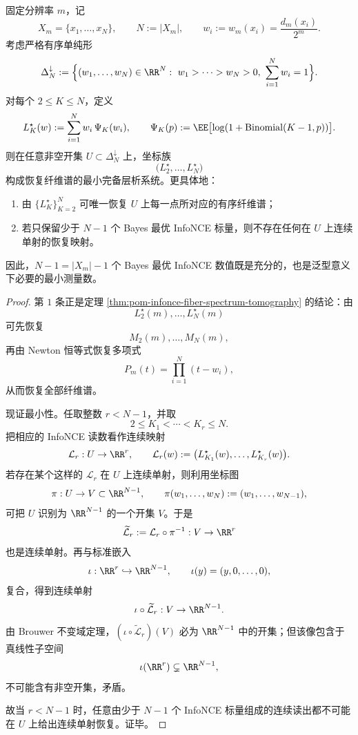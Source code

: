 \begin{theorem}\label{thm:pom-infonce-fiber-spectrum-tomography-minimality}
固定分辨率 \(m\)，记
\[
X_m=\{x_1,\dots,x_N\},
\qquad
N:=|X_m|,
\qquad
w_i:=w_m(x_i)=\frac{d_m(x_i)}{2^m}.
\]
考虑严格有序单纯形
\[
\Delta_N^\downarrow
:=
\Bigl\{
(w_1,\dots,w_N)\in\RR^N:\ 
w_1>\cdots>w_N>0,\ \sum_{i=1}^N w_i=1
\Bigr\}.
\]
对每个 \(2\le K\le N\)，定义
\[
L_K^\star(w):=\sum_{i=1}^{N}w_i\,\Psi_K(w_i),
\qquad
\Psi_K(p):=\EE\bigl[\log(1+\mathrm{Binomial}(K-1,p))\bigr].
\]
则在任意非空开集 \(U\subset \Delta_N^\downarrow\) 上，坐标族
\[
\bigl(L_2^\star,\dots,L_N^\star\bigr)
\]
构成恢复纤维谱的最小完备层析系统。更具体地：
\begin{enumerate}
  \item 由 \(\{L_K^\star\}_{K=2}^{N}\) 可唯一恢复 \(U\) 上每一点所对应的有序纤维谱；
  \item 若只保留少于 \(N-1\) 个 Bayes 最优 InfoNCE 标量，则不存在任何在 \(U\) 上连续单射的恢复映射。
\end{enumerate}
因此，\(N-1=|X_m|-1\) 个 Bayes 最优 InfoNCE 数值既是充分的，也是泛型意义下必要的最小测量数。
\end{theorem}
\begin{proof}
第 \(1\) 条正是定理 \ref{thm:pom-infonce-fiber-spectrum-tomography} 的结论：由
\[
L_2^\star(m),\dots,L_N^\star(m)
\]
可先恢复
\[
M_2(m),\dots,M_N(m),
\]
再由 Newton 恒等式恢复多项式
\[
P_m(t)=\prod_{i=1}^{N}(t-w_i),
\]
从而恢复全部纤维谱。

现证最小性。任取整数 \(r<N-1\)，并取
\[
2\le K_1<\cdots<K_r\le N.
\]
把相应的 InfoNCE 读数看作连续映射
\[
\mathcal L_r:U\to\RR^r,
\qquad
\mathcal L_r(w):=\bigl(L_{K_1}^\star(w),\dots,L_{K_r}^\star(w)\bigr).
\]
若存在某个这样的 \(\mathcal L_r\) 在 \(U\) 上连续单射，则利用坐标图
\[
\pi:U\to V\subset\RR^{N-1},
\qquad
\pi(w_1,\dots,w_N):=(w_1,\dots,w_{N-1}),
\]
可把 \(U\) 识别为 \(\RR^{N-1}\) 的一个开集 \(V\)。于是
\[
\widetilde{\mathcal L}_r:=\mathcal L_r\circ \pi^{-1}:V\to\RR^r
\]
也是连续单射。再与标准嵌入
\[
\iota:\RR^r\hookrightarrow\RR^{N-1},
\qquad
\iota(y)=(y,0,\dots,0),
\]
复合，得到连续单射
\[
\iota\circ \widetilde{\mathcal L}_r:V\to\RR^{N-1}.
\]
由 Brouwer 不变域定理，\((\iota\circ \widetilde{\mathcal L}_r)(V)\) 必为 \(\RR^{N-1}\) 中的开集；但该像包含于真线性子空间
\[
\iota(\RR^r)\subsetneq \RR^{N-1},
\]
不可能含有非空开集，矛盾。

故当 \(r<N-1\) 时，任意由少于 \(N-1\) 个 InfoNCE 标量组成的连续读出都不可能在 \(U\) 上给出连续单射恢复。证毕。
\end{proof}

\endinput
